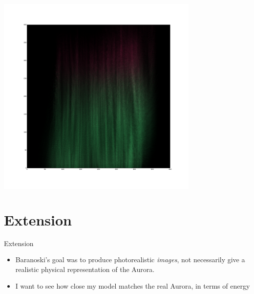 \documentclass[xcolor=pdftex,dvipsnames,table,usenames,11pt]{beamer}
\begin{document}
\begin{frame}
\begin{center}
\href{run:/home/kmills/Dropbox/3.AdvancedTopics/AdvancedTopics/project/AuroraSim/presentation/vid/Earth_1.mkv}{
	\includegraphics[width=0.75\textwidth]{img/Earth_thumbnail.png}
	}
\end{center}
\end{frame}





\section{Extension}
\begin{frame}{Extension}
\begin{itemize}
\item Baranoski's goal was to produce photorealistic \emph{images}, not necessarily give a realistic physical representation of the Aurora.
\item I want to see how close my model matches the real Aurora, in terms of energy
\end{itemize}
\end{frame}
\end{document}
